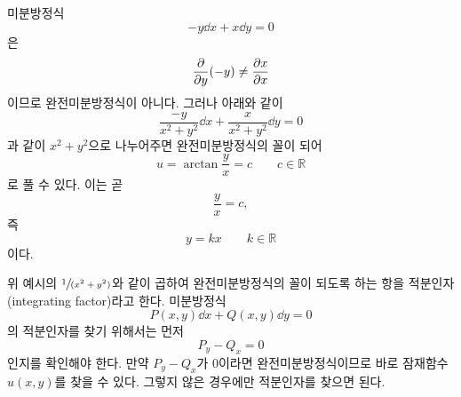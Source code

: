 \documentclass[../engineering_mathematics_lecture_note.tex]{subfiles}
\begin{document}
\begin{example}
    미분방정식
    \begin{equation*}
        -y \dd{x} + x \dd{y} = 0
    \end{equation*}
    은
    \begin{equation*}
        \pdv{y}(-y) \neq \pdv{x}{x}
    \end{equation*}
    이므로 완전미분방정식이 아니다.
    그러나 아래와 같이
    \begin{equation*}
        \frac{-y}{x^2 + y^2} \dd{x} + \frac{x}{x^2 + y^2} \dd{y} = 0
    \end{equation*}
    과 같이 $x^2 + y^2$으로 나누어주면 완전미분방정식의 꼴이 되어
    \begin{equation*}
        u = \arctan \frac yx = c \qquad c \in \mathbb R
    \end{equation*}
    로 풀 수 있다.
    이는 곧
    \begin{equation*}
        \frac yx = c,
    \end{equation*}
    즉
    \begin{equation*}
        y = kx \qquad k \in \mathbb R
    \end{equation*}
    이다.
\end{example}

위 예시의 $\sfrac{1}{(x^2 + y^2)}$와 같이 곱하여 완전미분방정식의 꼴이 되도록 하는 항을 적분인자(integrating factor)라고 한다.
미분방정식
\begin{equation*}
    P(x, y) \dd{x} + Q(x, y) \dd{y} = 0
\end{equation*}
의 적분인자를 찾기 위해서는 먼저
\begin{equation*}
    P_y - Q_x = 0
\end{equation*}
인지를 확인해야 한다.
만약 $P_y - Q_x$가 0이라면 완전미분방정식이므로 바로 잠재함수 $u(x, y)$를 찾을 수 있다.
그렇지 않은 경우에만 적분인자를 찾으면 된다.
\end{document}
